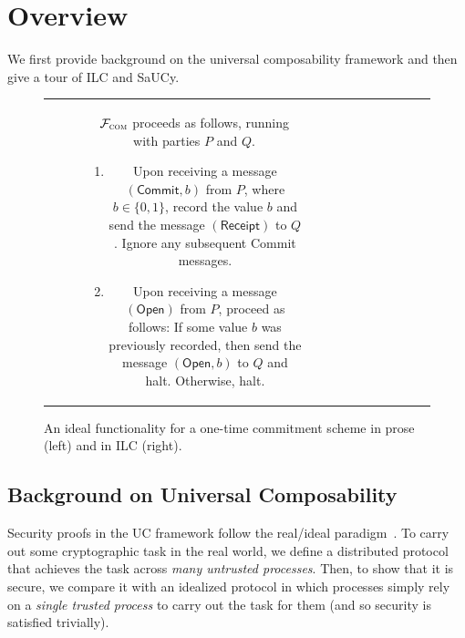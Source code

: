 \section{Overview}
\label{sec:overview}

We first provide background on the universal composability framework and then
give a tour of ILC and SaUCy.

\begin{figure}[t]
\centering
\begin{tabular}{c|c}
\begin{subfigure}{.575\textwidth}
    $\mathcal{{F}}_{\textsc{com}}$ proceeds as follows, running with parties $P$ and
  $Q$.
    \begin{enumerate}
        \item Upon receiving a message $(\mathsf{Commit}, b)$ from $P$, where $b
          \in \{ 0, 1 \}$, record the value $b$ and send the message
          $(\mathsf{Receipt})$ to $Q$. Ignore any subsequent \textsf{Commit}
          messages.
        \item Upon receiving a message $(\mathsf{Open})$ from $P$, proceed as
          follows: If some value $b$ was previously recorded, then send the
          message $(\mathsf{Open}, b)$ to $Q$ and halt. Otherwise, halt.
    \end{enumerate}
\label{func:com}
\end{subfigure}\hspace{0.02\textwidth}
&\hspace{0.02\textwidth}
\begin{subfigure}{.35\textwidth}
  
\end{subfigure}
\end{tabular}
\caption{An ideal functionality for a one-time commitment scheme in prose (left)
  and in ILC (right).}
\label{func:com}
\end{figure}

\subsection{Background on Universal Composability}
\label{subsec:background-uc}

Security proofs in the UC framework follow the real/ideal
paradigm~\cite{goldreich1987play}. To carry out some cryptographic task in the
real world, we define a distributed protocol that achieves the task across
\emph{many untrusted processes}. Then, to show that it is secure, we compare it
with an idealized protocol in which processes simply rely on a \emph{single
  trusted process} to carry out the task for them (and so security is satisfied
trivially).

